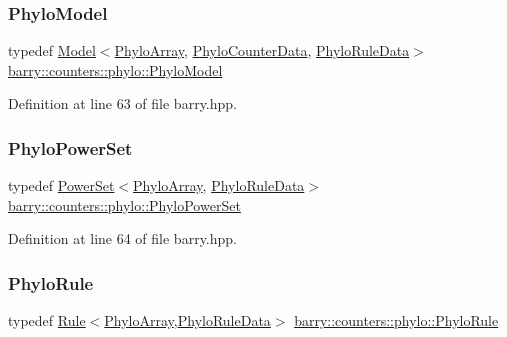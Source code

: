 \subsubsection{\texorpdfstring{Phylo\+Model}{PhyloModel}}
{\footnotesize\ttfamily typedef \hyperlink{classbarry_1_1_model}{Model}$<$\hyperlink{namespacebarry_1_1counters_1_1phylo_abd293bf65e494e903639fb5fb2c91604}{Phylo\+Array}, \hyperlink{namespacebarry_1_1counters_1_1phylo_a6ecc0d8ab76f8dc2db152221a8e9e95a}{Phylo\+Counter\+Data}, \hyperlink{namespacebarry_1_1counters_1_1phylo_a5da540950bcf3372bcedb17a5b23667c}{Phylo\+Rule\+Data}$>$ \hyperlink{namespacebarry_1_1counters_1_1phylo_ad32b4186e3bab93119df225fddc3c609}{barry\+::counters\+::phylo\+::\+Phylo\+Model}}



Definition at line 63 of file barry.\+hpp.

\mbox{\label{namespacebarry_1_1counters_1_1phylo_ae89de0bf34247cac5b080aeb29b25239}} 
\subsubsection{\texorpdfstring{Phylo\+Power\+Set}{PhyloPowerSet}}
{\footnotesize\ttfamily typedef \hyperlink{classbarry_1_1_power_set}{Power\+Set}$<$\hyperlink{namespacebarry_1_1counters_1_1phylo_abd293bf65e494e903639fb5fb2c91604}{Phylo\+Array}, \hyperlink{namespacebarry_1_1counters_1_1phylo_a5da540950bcf3372bcedb17a5b23667c}{Phylo\+Rule\+Data}$>$ \hyperlink{namespacebarry_1_1counters_1_1phylo_ae89de0bf34247cac5b080aeb29b25239}{barry\+::counters\+::phylo\+::\+Phylo\+Power\+Set}}



Definition at line 64 of file barry.\+hpp.

\mbox{\label{namespacebarry_1_1counters_1_1phylo_a46a7015a86c3c1f9df301fb181ccd82c}} 
\subsubsection{\texorpdfstring{Phylo\+Rule}{PhyloRule}}
{\footnotesize\ttfamily typedef \hyperlink{classbarry_1_1_rule}{Rule}$<$\hyperlink{namespacebarry_1_1counters_1_1phylo_abd293bf65e494e903639fb5fb2c91604}{Phylo\+Array},\hyperlink{namespacebarry_1_1counters_1_1phylo_a5da540950bcf3372bcedb17a5b23667c}{Phylo\+Rule\+Data}$>$ \hyperlink{namespacebarry_1_1counters_1_1phylo_a46a7015a86c3c1f9df301fb181ccd82c}{barry\+::counters\+::phylo\+::\+Phylo\+Rule}}



